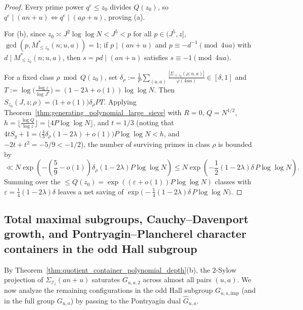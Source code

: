 \documentclass[11pt, a4paper]{article}
\theoremstyle{plain}
\theoremstyle{definition}
\begin{document}
\begin{proof}
Every prime power $q^{e}\le z_0$ divides $Q(z_0)$, so $q^{e}\mid(an+u)\iff q^{e}\mid(a\rho+u)$, proving (a). 

For (b), since $z_0\asymp J^{2}\log\log N<J^{5}<p$ for all $p\in(J^{5},z]$, $\gcd(p,M_{\le z_0}^{\ast}(n;u,a))=1$; if $p\mid(an+u)$ and $p\equiv-d^{-1}\pmod{4ua}$ with $d\mid M_{\le z_0}^{\ast}(n;u,a)$, then $s=pd\mid(an+u)$ satisfies $s\equiv-1\pmod{4ua}$. 

For a fixed class $\rho\bmod Q(z_0)$, set $\delta_\rho:=\frac1P\sum_{(u,a)}\frac{|\Sigma_{\le z_0}(\rho;u,a)|}{\varphi(4ua)}\in[\delta,1]$ and $T:=\log\big(\frac{\log z}{\log J^{5}}\big)=(1-2\lambda+o(1))\log\log N$. Then $S_{z_0}(J,z;\rho)=\big(1+o(1)\big)\delta_\rho PT$. Applying Theorem~\ref{thm:generating_polynomial_large_sieve} with $R=0$, $Q=N^{1/2}$, $h=\lfloor\frac{\log Q}{\log z}\rfloor=\lfloor 4P\log\log N\rfloor$, and $t=1/3$ (noting that $4tS_y+1=\big(\frac43\delta_\rho(1-2\lambda)+o(1)\big)P\log\log N<h$, and $-2t+t^{2}=-5/9<-1/2$), the number of surviving primes in class $\rho$ is bounded by 
\[
\ll N\exp\left(-\left(\frac59-o(1)\right)\delta_\rho(1-2\lambda)P\log\log N\right)\le N\exp\left(-\frac12(1-2\lambda)\delta\,P\log\log N\right).
\]
Summing over the $\le Q(z_0)=\exp((\varepsilon+o(1))P\log\log N)$ classes with $\varepsilon=\frac14(1-2\lambda)\delta$ leaves a net saving of $\exp\big(-\frac14(1-2\lambda)\delta\,P\log\log N\big)$.
\end{proof}

\subsection{Total maximal subgroups, Cauchy--Davenport growth, and Pontryagin--Plancherel character containers in the odd Hall subgroup}\label{subsec:plancherel_containers}

By Theorem~\ref{thm:quotient_container_polynomial_depth}(b), the $2$-Sylow projection of $\Sigma_{\mathcal{I}_1}(an+u)$ saturates $G_{u,a,2}$ across almost all pairs $(u,a)$. We now analyze the remaining configurations in the odd Hall subgroup $G_{u,a,\mathrm{imp}}$ (and in the full group $G_{u,a}$) by passing to the Pontryagin dual $\widehat{G}_{u,a}$.
\end{document}
